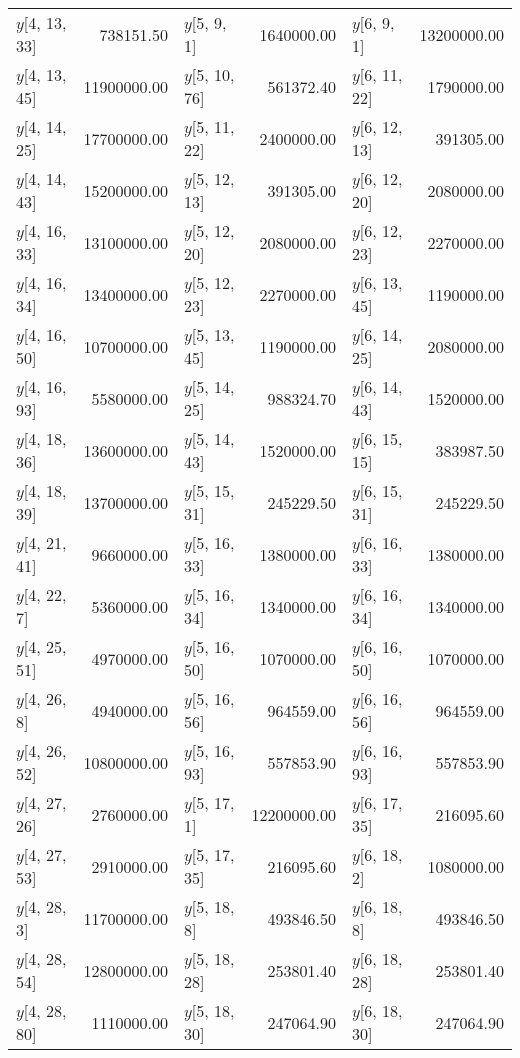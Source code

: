 \begin{longtable}{lrlrlr}
$y$[4, 13, 33] & 738151.50 & $y$[5, 9, 1] & 1640000.00 & $y$[6, 9, 1] & 13200000.00 \\
$y$[4, 13, 45] & 11900000.00 & $y$[5, 10, 76] & 561372.40 & $y$[6, 11, 22] & 1790000.00 \\
$y$[4, 14, 25] & 17700000.00 & $y$[5, 11, 22] & 2400000.00 & $y$[6, 12, 13] & 391305.00 \\
$y$[4, 14, 43] & 15200000.00 & $y$[5, 12, 13] & 391305.00 & $y$[6, 12, 20] & 2080000.00 \\
$y$[4, 16, 33] & 13100000.00 & $y$[5, 12, 20] & 2080000.00 & $y$[6, 12, 23] & 2270000.00 \\
$y$[4, 16, 34] & 13400000.00 & $y$[5, 12, 23] & 2270000.00 & $y$[6, 13, 45] & 1190000.00 \\
$y$[4, 16, 50] & 10700000.00 & $y$[5, 13, 45] & 1190000.00 & $y$[6, 14, 25] & 2080000.00 \\
$y$[4, 16, 93] & 5580000.00 & $y$[5, 14, 25] & 988324.70 & $y$[6, 14, 43] & 1520000.00 \\
$y$[4, 18, 36] & 13600000.00 & $y$[5, 14, 43] & 1520000.00 & $y$[6, 15, 15] & 383987.50 \\
$y$[4, 18, 39] & 13700000.00 & $y$[5, 15, 31] & 245229.50 & $y$[6, 15, 31] & 245229.50 \\
$y$[4, 21, 41] & 9660000.00 & $y$[5, 16, 33] & 1380000.00 & $y$[6, 16, 33] & 1380000.00 \\
$y$[4, 22, 7] & 5360000.00 & $y$[5, 16, 34] & 1340000.00 & $y$[6, 16, 34] & 1340000.00 \\
$y$[4, 25, 51] & 4970000.00 & $y$[5, 16, 50] & 1070000.00 & $y$[6, 16, 50] & 1070000.00 \\
$y$[4, 26, 8] & 4940000.00 & $y$[5, 16, 56] & 964559.00 & $y$[6, 16, 56] & 964559.00 \\
$y$[4, 26, 52] & 10800000.00 & $y$[5, 16, 93] & 557853.90 & $y$[6, 16, 93] & 557853.90 \\
$y$[4, 27, 26] & 2760000.00 & $y$[5, 17, 1] & 12200000.00 & $y$[6, 17, 35] & 216095.60 \\
$y$[4, 27, 53] & 2910000.00 & $y$[5, 17, 35] & 216095.60 & $y$[6, 18, 2] & 1080000.00 \\
$y$[4, 28, 3] & 11700000.00 & $y$[5, 18, 8] & 493846.50 & $y$[6, 18, 8] & 493846.50 \\
$y$[4, 28, 54] & 12800000.00 & $y$[5, 18, 28] & 253801.40 & $y$[6, 18, 28] & 253801.40 \\
$y$[4, 28, 80] & 1110000.00 & $y$[5, 18, 30] & 247064.90 & $y$[6, 18, 30] & 247064.90 \\

\end{longtable}
